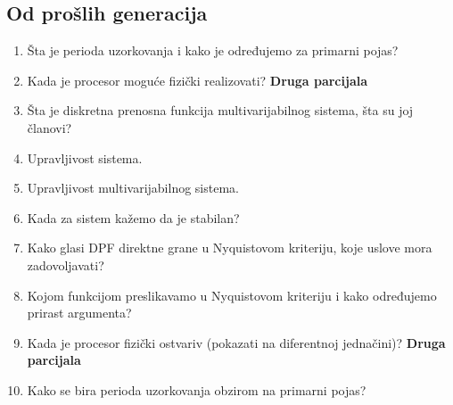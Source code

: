 \documentclass{article}
\begin{document}
	\subsection*{Od prošlih generacija}
	
	\begin{enumerate}
		\item Šta je perioda uzorkovanja i kako je određujemo za primarni pojas?
		\item Kada je procesor moguće fizički realizovati? \textbf{Druga parcijala}
		\item Šta je diskretna prenosna funkcija multivarijabilnog sistema, šta su joj članovi?
		\item Upravljivost sistema.
		\item Upravljivost multivarijabilnog sistema.
		\item Kada za sistem kažemo da je stabilan?
		\item Kako glasi DPF direktne grane u Nyquistovom kriteriju, koje uslove mora zadovoljavati?
		\item Kojom funkcijom preslikavamo u Nyquistovom kriteriju i kako određujemo prirast argumenta?
		\item Kada je procesor fizički ostvariv (pokazati na diferentnoj jednačini)? \textbf{Druga parcijala}
		\item Kako se bira perioda uzorkovanja obzirom na primarni pojas?
	\end{enumerate}
\end{document}
